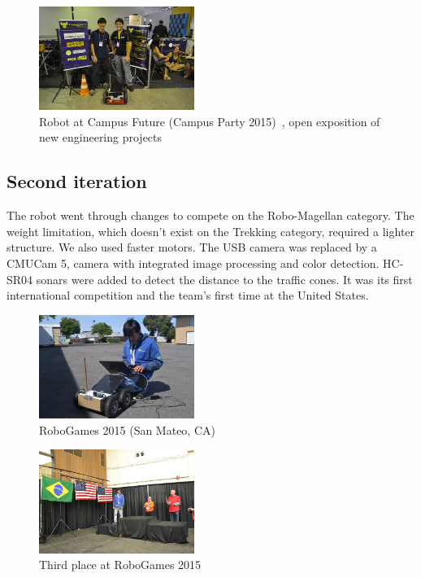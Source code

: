 \documentclass[conference]{IEEEtran}
\begin{document}
\begin{figure}[H]
    \centering
    \includegraphics[width=0.45\textwidth]{../Pictures/v1/URC2014/16907969931_064dda21f8_z.jpg}
    \caption{Robot at Campus Future (Campus Party 2015)~\cite{Campus-Future},
    open exposition of new engineering projects}
\end{figure}

\subsection{Second iteration}
The robot went through changes to compete on the Robo-Magellan category.
The weight limitation, which doesn't exist on the Trekking category, required
a lighter structure. We also used faster motors.
The USB camera was replaced by a CMUCam 5, camera with integrated image
processing and color detection. HC-SR04 sonars were added to detect the
distance to the traffic cones.
It was its first international competition and the team's first time at the
United States.

\begin{figure}[H]
    \centering
    \includegraphics[width=0.45\textwidth]{../Pictures/v2/RG2015/16982466210_3565d58788_z.jpg}
    \caption{RoboGames 2015 (San Mateo, CA)}
\end{figure}

\begin{figure}[H]
    \centering
    \includegraphics[width=0.45\textwidth]{../Pictures/v2/RG2015/17168959772_304585a0eb_z.jpg}
    \caption{Third place at RoboGames 2015}
\end{figure}
\end{document}
